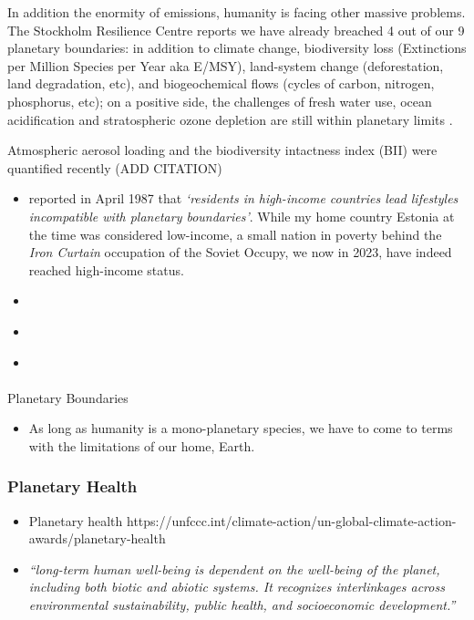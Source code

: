 \documentclass[
  letterpaper,
  DIV=11,
  numbers=noendperiod]{scrartcl}
\makeatletter
\let\oldparagraph\paragraph
\renewcommand{\paragraph}{
    \@ifstar
      \xxxParagraphStar
      \xxxParagraphNoStar
  }
\newcommand{\xxxParagraphStar}[1]{\oldparagraph*{#1}\mbox{}}
\newcommand{\xxxParagraphNoStar}[1]{\oldparagraph{#1}\mbox{}}
\providecommand{\tightlist}{%
  \setlength{\itemsep}{0pt}\setlength{\parskip}{0pt}}\usepackage{longtable,booktabs,array}
\makeatother
\begin{document}
In addition the enormity of emissions, humanity is facing other massive
problems. The Stockholm Resilience Centre reports we have already
breached 4 out of our 9 planetary boundaries: in addition to climate
change, biodiversity loss (Extinctions per Million Species per Year aka
E/MSY), land-system change (deforestation, land degradation, etc), and
biogeochemical flows (cycles of carbon, nitrogen, phosphorus, etc); on a
positive side, the challenges of fresh water use, ocean acidification
and stratospheric ozone depletion are still within planetary limits
\citep{perssonOutsideSafeOperating2022}.

Atmospheric aerosol loading and the biodiversity intactness index (BII)
were quantified recently (ADD CITATION)

\begin{itemize}
\tightlist
\item
  \citep{keebleBrundtlandReportOur1988} reported in April 1987 that
  \emph{`residents in high-income countries lead lifestyles incompatible
  with planetary boundaries'}. While my home country Estonia at the time
  was considered low-income, a small nation in poverty behind the
  \emph{Iron Curtain} occupation of the Soviet Occupy, we now in 2023,
  have indeed reached high-income status.
\item
  \citet{debalieKateRaworthCreating2018}
\item
  \citet{houdiniPlanetaryBoundariesAssessment2018}
\item
  \citet{haeggmanPlanetaryBoundariesAnalysis2018}
\end{itemize}

\paragraph{Planetary Boundaries}\label{planetary-boundaries}

\begin{itemize}
\tightlist
\item
  As long as humanity is a mono-planetary species, we have to come to
  terms with the limitations of our home, Earth.
\end{itemize}

\subsubsection{Planetary Health}\label{planetary-health}

\begin{itemize}
\item
  Planetary health
  https://unfccc.int/climate-action/un-global-climate-action-awards/planetary-health
\item
  \citet{wardaniBoundariesSpacesKnowledge2023} \emph{``long-term human
  well-being is dependent on the well-being of the planet, including
  both biotic and abiotic systems. It recognizes interlinkages across
  environmental sustainability, public health, and socioeconomic
  development.''}
\end{itemize}
\end{document}
